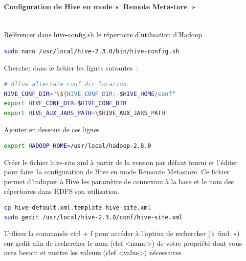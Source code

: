 \documentclass[12pt,english]{book}
\begin{document}
\paragraph{Configuration de Hive en mode « Remote Metastore » }\mbox{}\\

Référencer dans hive-config.sh le répertoire d’utilisation d’Hadoop

\begin{lstlisting}[language=bash, frame=single]
sudo nano /usr/local/hive-2.3.0/bin/hive-config.sh 
\end{lstlisting}

Chercher dans le fichier les lignes suivantes :
\begin{lstlisting}[language=bash, frame=single]
# Allow alternate conf dir location.
HIVE_CONF_DIR="\${HIVE_CONF_DIR:-$HIVE_HOME/conf"
export HIVE_CONF_DIR=$HIVE_CONF_DIR
export HIVE_AUX_JARS_PATH=\$HIVE_AUX_JARS_PATH
\end{lstlisting}

Ajouter en dessous de ces lignes

\begin{lstlisting}[language=bash, frame=single]
export HADOOP_HOME=/usr/local/hadoop-2.8.0
\end{lstlisting}

Créer le fichier hive-site.xml à partir de la version par défaut fourni et l’éditer pour faire la configuration de Hive en mode Remonte Metastore.
Ce fichier permet d’indiquer à Hive les paramètre de connexion à la base et le nom des répertoires dans HDFS son utilisation.

\begin{lstlisting}[language=bash, frame=single]
cp hive-default.xml.template hive-site.xml
sudo gedit /usr/local/hive-2.3.0/conf/hive-site.xml 
\end{lstlisting}

Utilisez la commande ctrl + f pour accéder à l’option de rechercher (« find ») sur gedit afin de rechercher le nom (clef <name>) de votre propriété dont vous avez besoin et mettre les valeurs (clef <value>) nécessaires. 
\end{document}
